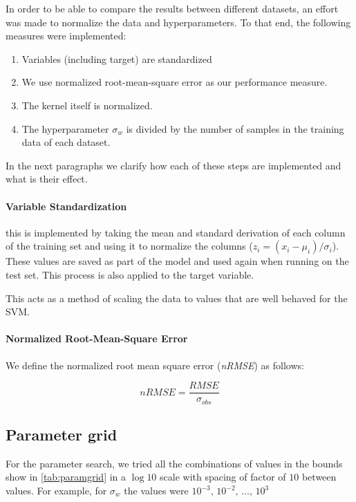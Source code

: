 In order to be able to compare the results between different datasets, an effort
was made to normalize the data and hyperparameters. To that end, the
following measures were implemented:

\begin{enumerate}
    \item Variables (including target) are standardized
    \item We use normalized root-mean-square error as our performance
        measure.
    \item The kernel itself is normalized.
    \item The hyperparameter $\sigma_w$ is divided by the number of samples in
        the training data of each dataset.
\end{enumerate}

In the next paragraphs we clarify how each of these steps are implemented and
what is their effect.

\paragraph{Variable Standardization} this is implemented by taking the mean and
standard derivation of each column of the training set and using it to
normalize the columns ($z_i = (x_i - \mu_i)/\sigma_i$). These values are saved as
part of the model and used again when running on the test set. This process
is also applied to the target variable.

This acts as a method of scaling the data to values that are well behaved
for the SVM.

\paragraph{Normalized Root-Mean-Square Error} We define the
normalized root mean square error (\emph{nRMSE}) as follows:

\begin{equation}
    nRMSE = \frac{RMSE}{\sigma_{obs}}
\end{equation}

\subsection{Parameter grid}

For the parameter search, we tried all the combinations of values
in the bounds show in \cref{tab:paramgrid} in a $\log 10$ scale with
spacing of factor of $10$ between values. For example, for $\sigma_w$ the values
were $10^{-3},\,10^{-2},\,\dots,\,10^{3}$

